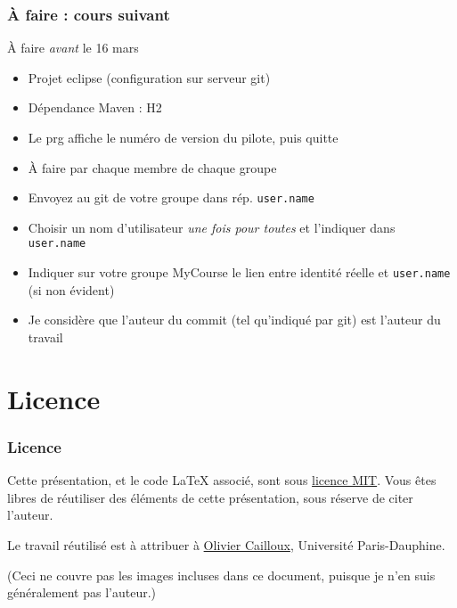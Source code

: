 \documentclass[english, french]{beamer}
\begin{document}
\begin{frame}
	\frametitle{À faire : cours suivant}
	\begin{block}{À faire \emph{avant} le 16 mars}
		\begin{itemize}
			\item Projet eclipse (configuration sur serveur git)
			\item Dépendance Maven : H2
			\item Le prg affiche le numéro de version du pilote, puis quitte
			\item À faire par chaque membre de chaque groupe
			\item Envoyez au git de votre groupe dans rép. \texttt{user.name}
		\end{itemize}
	\end{block}
	\begin{itemize}
		\item Choisir un nom d’utilisateur \emph{une fois pour toutes} et l’indiquer dans \texttt{user.name}
		\item Indiquer sur votre groupe MyCourse le lien entre identité réelle et \texttt{user.name} (si non évident)
		\item Je considère que l’auteur du commit (tel qu’indiqué par git) est l’auteur du travail
	\end{itemize}
\end{frame}

\appendix
\AtBeginSection{
}
\section{Licence}
\begin{frame}
	\frametitle{Licence}
	Cette présentation, et le code LaTeX associé, sont sous \href{http://opensource.org/licenses/MIT}{licence MIT}. Vous êtes libres de réutiliser des éléments de cette présentation, sous réserve de citer l’auteur.
	
	Le travail réutilisé est à attribuer à \href{http://www.lamsade.dauphine.fr/~ocailloux/}{Olivier Cailloux}, Université Paris-Dauphine.
	
	\small{(Ceci ne couvre pas les images incluses dans ce document, puisque je n’en suis généralement pas l’auteur.)}
\end{frame}
\end{document}
